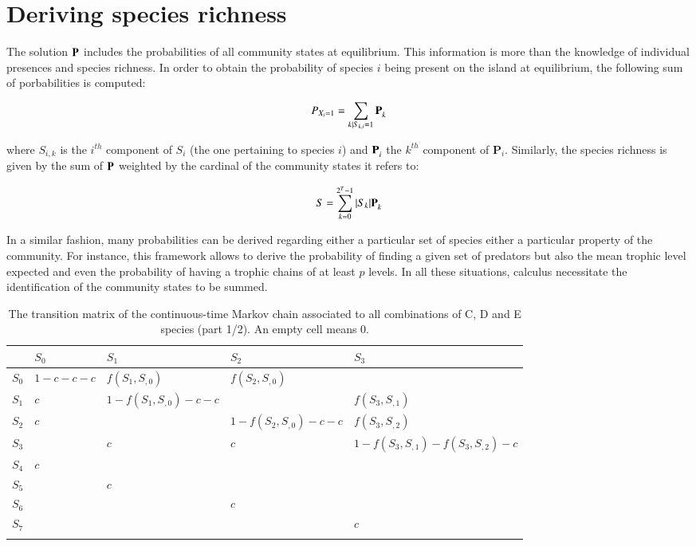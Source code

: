 \section{Deriving species richness}\label{deriving-species-richness}

The solution \(\mathbf{P}^{\*}\) includes the probabilities of all
community states at equilibrium. This information is more than
the knowledge of individual presences and species richness.
In order to obtain the probability of species $i$ being present on the island
at equilibrium, the following sum of porbabilities is computed:

\begin{equation}
P_{X_i=1} = \sum_{k \mid S_{k,i}=1} \mathbf{P}_{k}^{\*}
\end{equation}

where \(S_{i,k}\) is the \(i^{th}\) component of \(S_i\) (the one
pertaining to species \(i\)) and \(\mathbf{P}_{i}^{\*}\) the \(k^{th}\)
component of \(\mathbf{P}_{i}\). Similarly, the species richness is
given by the sum of \(\mathbf{P}^{\*}\) weighted by the cardinal of the
community states it refers to:

\begin{equation}
S= \sum_{k=0}^{2^T-1} |S_k|\mathbf{P}_{k}^{\*}
\end{equation}

In a similar fashion, many probabilities can be derived regarding either
a particular set of species either a particular property of the
community. For instance, this framework allows to derive the probability
of finding a given set of predators but also the mean trophic level
expected and even the probability of having a trophic chains of at least
\(p\) levels. In all these situations, calculus necessitate the
identification of the community states to be summed.


\newpage

\begin{landscape}

  \begin{longtable}[]{@{}lllll@{}}
  \caption[Transition matrix of the continuous-time Markov chain (part 1/2)]{The transition matrix of the continuous-time Markov chain
  associated to all combinations of C, D and E species (part 1/2). An empty cell means 0. }\tabularnewline
  \toprule
  & \(S_{0}\) & \(S_{1}\) & \(S_{2}\) & \(S_{3}\)\tabularnewline
  \midrule
  \endhead
  \(S_{0}\) & \(1-c-c-c\) & \(f(S_{1},S_{,0})\) & \(f(S_{2},S_{,0})\)
  &\tabularnewline
  \(S_{1}\) & \(c\) & \(1-f(S_{1},S_{,0})-c-c\) & &
  \(f(S_{3},S_{,1})\)\tabularnewline
  \(S_{2}\) & \(c\) & & \(1-f(S_{2},S_{,0})-c-c\) &
  \(f(S_{3},S_{,2})\)\tabularnewline
  \(S_{3}\) & & \(c\) & \(c\) &
  \(1-f(S_{3},S_{,1})-f(S_{3},S_{,2})-c\)\tabularnewline
  \(S_{4}\) & \(c\) & & &\tabularnewline
  \(S_{5}\) & & \(c\) & &\tabularnewline
  \(S_{6}\) & & & \(c\) &\tabularnewline
  \(S_{7}\) & & & & \(c\)\tabularnewline
  \bottomrule
  \label{tabAnnIII_3}
  \end{longtable}

\end{landscape}



